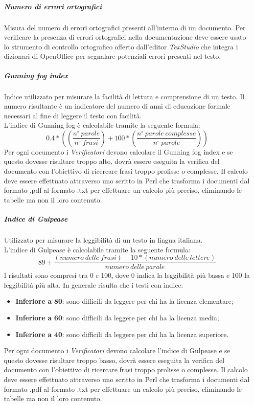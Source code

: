 \subparagraph{Numero di errori ortografici}\Spazio
Misura del numero di errori ortografici presenti all'interno di un documento.
Per verificare la presenza di errori ortografici nella documentazione deve essere usato lo strumento di controllo ortografico offerto dall'editor \emph{TexStudio} che integra i dizionari di OpenOffice per segnalare potenziali errori presenti nel testo.

\subparagraph{Gunning fog index}\Spazio
Indice utilizzato per misurare la facilità di lettura e comprensione di un testo. Il numero risultante è un indicatore del numero di anni di educazione formale necessari al fine di leggere il testo con facilità. \\
L'indice di Gunning fog è calcolabile tramite la seguente formula:
$$
0.4*((\frac{n^{\circ}\:parole}{n^{\circ}\:frasi})+100*(\frac{n^{\circ}\:parole\:complesse}{n^{\circ}\:parole}))
$$
Per ogni documento i \emph{Verificatori} devono calcolare il Gunning fog index e se questo dovesse risultare troppo alto, dovrà essere eseguita la verifica del documento con l'obiettivo di ricercare frasi troppo prolisse o complesse. Il calcolo deve essere effettuato attraverso uno  scritto in Perl che trasforma i documenti dal formato .pdf al formato .txt per effettuare un calcolo più preciso, eliminando le tabelle ma non il loro contenuto.
\subparagraph{Indice di Gulpease}\Spazio
Utilizzato per misurare la leggibilità di un testo in lingua italiana.\\
L'indice di Gulpease è calcolabile tramite la seguente formula:
$$
89+\frac{(numero\:delle\:frasi)-10*(numero\:delle\:lettere)}{numero\:delle\:parole}
$$
I risultati sono compresi tra 0 e 100, dove 0 indica la leggibilità più bassa e 100 la leggibilità più alta. In generale risulta che i testi con indice:
\begin{itemize}
	\item{\textbf{Inferiore	a 80}}: sono difficili da leggere per chi ha la licenza elementare;
	\item{\textbf{Inferiore	a 60}}: sono difficili da leggere per chi ha la licenza media;
	\item{\textbf{Inferiore	a 40}}: sono difficili da leggere per chi ha la licenza superiore.
\end{itemize}
Per ogni documento i \emph{Verificatori} devono calcolare l'indice di Gulpease e se questo dovesse risultare troppo basso, dovrà essere eseguita la verifica del documento con l'obiettivo di ricercare frasi troppo prolisse o complesse. Il calcolo deve essere effettuato attraverso uno  scritto in Perl che trasforma i documenti dal formato .pdf al formato .txt per effettuare un calcolo più preciso, eliminando le tabelle ma non il loro contenuto.
